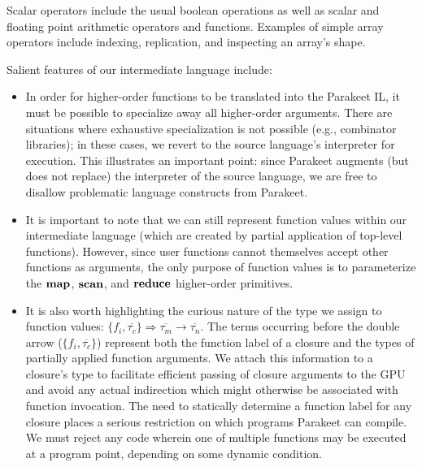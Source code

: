 \documentclass[preprint]{sigplanconf}
\begin{document}
Scalar operators include the usual boolean operations as well as scalar and
floating point arithmetic operators and functions. Examples of simple array
operators include indexing, replication, and inspecting an array's shape.

Salient features of our intermediate language include:
\begin{itemize}
\item In order for higher-order functions to be translated into the Parakeet IL,
it must be possible to specialize away all higher-order arguments. There
are situations where exhaustive specialization is not possible (e.g., combinator
libraries); in these cases, we revert to the source language's interpreter for
execution. This illustrates an important point: since Parakeet augments (but
does not replace) the interpreter of the source language, we are free to
disallow problematic language constructs from Parakeet.

\item It is important to note that we can still represent function values
within our intermediate language (which are created by partial application of
top-level functions). However, since user functions cannot themselves accept
other functions as arguments, the only purpose of function values is to
parameterize the $\mbox{\textbf{map}}$, $\mbox{\textbf{scan}}$, and $\mbox{\textbf{reduce}}$ higher-order primitives.

\item It is also worth highlighting the curious nature of the type we assign to
function values:
$ \{ f_i, \overline{\tau_{c}} \} \Rightarrow \overline{\tau_m} \rightarrow
\overline{\tau_n}$.  The terms occurring before the double arrow ($\{f_i,
\overline{\tau_{c}} \}$) represent both the function label of a closure and the
types of partially applied function arguments. We attach this information to a
closure's type to facilitate efficient passing of closure arguments to the GPU
and avoid any actual indirection which might otherwise be associated with
function invocation. The need to statically determine a function label for any
closure places a serious restriction on which programs Parakeet can compile. We
must reject any code wherein one of multiple functions may be executed at a
program point, depending on some dynamic condition.
\end{itemize}
\end{document}
